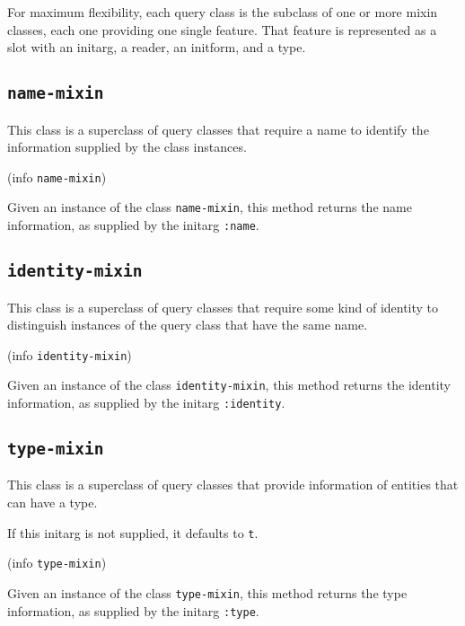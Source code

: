 For maximum flexibility, each query class is the subclass of one or
more mixin classes, each one providing one single feature.  That
feature is represented as a slot with an initarg, a reader, an
initform, and a type.

\subsection{\texttt{name-mixin}}


This class is a superclass of query classes that require a name to
identify the information supplied by the class instances.


 {(info {\tt name-mixin})}

Given an instance of the class \texttt{name-mixin}, this method
returns the name information, as supplied by the initarg
\texttt{:name}.

\subsection{\texttt{identity-mixin}}


This class is a superclass of query classes that require some kind of
identity to distinguish instances of the query class that have the
same name.


 {(info {\tt identity-mixin})}

Given an instance of the class \texttt{identity-mixin}, this method
returns the identity information, as supplied by the initarg
\texttt{:identity}.

\subsection{\texttt{type-mixin}}


This class is a superclass of query classes that provide information
of entities that can have a type.


If this initarg is not supplied, it defaults to \texttt{t}.

 {(info {\tt type-mixin})}

Given an instance of the class \texttt{type-mixin}, this method
returns the type information, as supplied by the initarg
\texttt{:type}.

